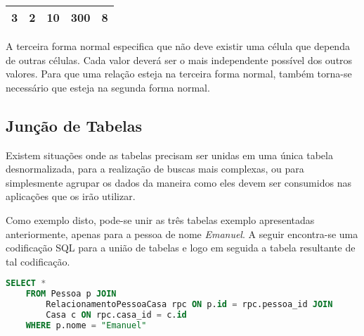 \begin{table}[h]
\begin{tabular}{|c|c|c|c|c|}
        3                                                                                                    & 2                                                                                                & 10                                                                                             & 300                                                    & 8                                                             \\ \hline
    \end{tabular}
\end{table}
    
A terceira forma normal especifica que não deve existir uma célula que dependa de outras células. Cada valor deverá ser o mais independente possível dos outros valores. Para que uma relação esteja na terceira forma normal, também torna-se necessário que esteja na segunda forma normal.

\subsection{Junção de Tabelas}
    
Existem situações onde as tabelas precisam ser unidas em uma única tabela desnormalizada, para a realização de buscas mais complexas, ou para simplesmente agrupar os dados da maneira como eles devem ser consumidos nas aplicações que os irão utilizar.
    
Como exemplo disto, pode-se unir as três tabelas exemplo apresentadas anteriormente, apenas para a pessoa de nome \textit{Emanuel}. A seguir encontra-se uma codificação SQL para a união de tabelas e logo em seguida a tabela resultante de tal codificação.

\begin{lstlisting}[language=SQL, caption={União de Tabelas com SQL}]
    SELECT * 
    FROM Pessoa p JOIN
        RelacionamentoPessoaCasa rpc ON p.id = rpc.pessoa_id JOIN
        Casa c ON rpc.casa_id = c.id
    WHERE p.nome = "Emanuel"
\end{lstlisting}
    
